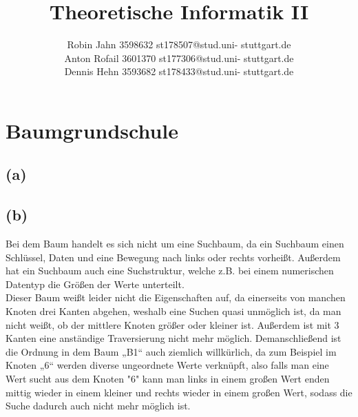\documentclass{article}
\title{Theoretische Informatik II}
\author{Robin Jahn 3598632 st178507@stud.uni-
stuttgart.de \\
Anton Rofail 3601370 st177306@stud.uni-
stuttgart.de \\
Dennis Hehn 3593682 st178433@stud.uni-
stuttgart.de}
\begin{document}
\maketitle

\section{Baumgrundschule}
\subsection{(a)}



\subsection{(b)}
Bei dem Baum handelt es sich nicht um eine  Suchbaum, da ein Suchbaum einen Schlüssel, Daten und eine Bewegung nach links oder rechts vorheißt. Außerdem hat ein Suchbaum auch eine Suchstruktur, welche z.B. bei einem numerischen Datentyp die Größen der Werte unterteilt. \\
Dieser Baum weißt leider nicht die Eigenschaften auf, da einerseits von manchen Knoten drei Kanten abgehen, weshalb eine Suchen quasi unmöglich ist, da man nicht weißt, ob der mittlere Knoten größer oder kleiner ist. Außerdem ist mit 3 Kanten eine anständige Traversierung nicht mehr möglich. Demanschließend ist die Ordnung in dem Baum „B1“ auch ziemlich willkürlich, da zum Beispiel im Knoten „6“ werden diverse ungeordnete Werte verknüpft, also falls man eine Wert sucht aus dem Knoten "6" kann man links in einem großen Wert enden mittig wieder in einem kleiner und rechts wieder in einem großen Wert, sodass die Suche dadurch auch nicht mehr möglich ist.\\

\subsection{}
\end{document}
